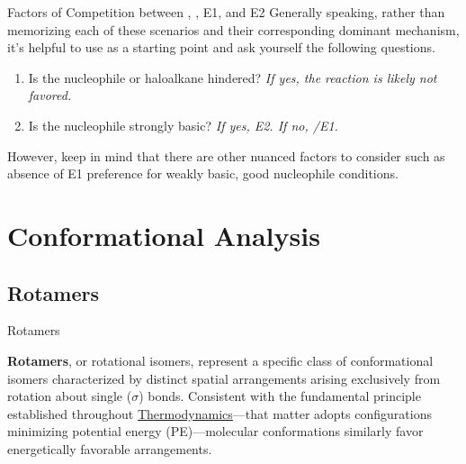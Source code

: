 \documentclass[10pt]{article}
\begin{document}
\begin{core}{Factors of Competition between \snt, \sno, E1, and E2}
      Generally speaking, rather than memorizing each of these scenarios and their corresponding dominant mechanism, it's helpful to use \snt as a starting point and ask yourself the following questions.

      \begin{enumerate}

        \item Is the nucleophile or haloalkane hindered? \textit{If yes, the \snt reaction is likely not favored.}

        \item Is the nucleophile strongly basic? \textit{If yes, E2. If no, \sno/E1.}
          
      \end{enumerate}

      However, keep in mind that there are other nuanced factors to consider such as absence of E1 preference for weakly basic, good nucleophile conditions.

    \end{core}

\section{Conformational Analysis}

  \subsection{Rotamers}

    \begin{core}{Rotamers}
   
      \textbf{Rotamers}, or rotational isomers, represent a specific class of conformational isomers characterized by distinct spatial arrangements arising exclusively from rotation about single ($\sigma$) bonds. Consistent with the fundamental principle established throughout \href{https://ibahng.github.io/chemistry/thermodynamics/thermodynamics.pdf}{Thermodynamics}---that matter adopts configurations minimizing potential energy (PE)---molecular conformations similarly favor energetically favorable arrangements.

    \end{core}
\end{document}
